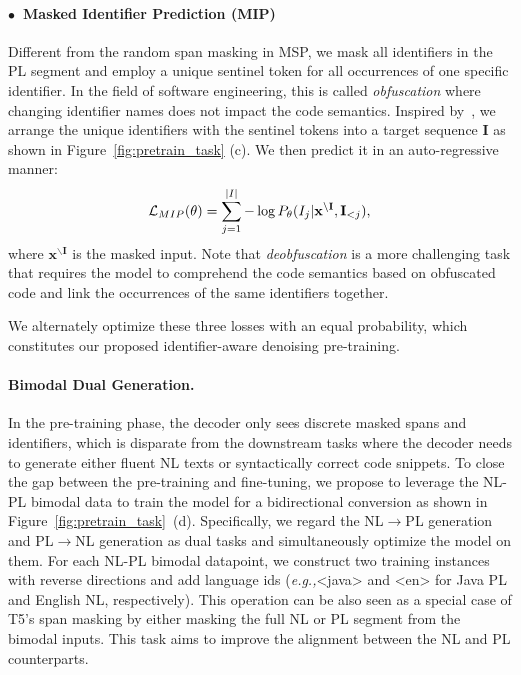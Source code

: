 \documentclass[11pt]{article}
\newcommand{\eg}{{\em e.g.,}\xspace}
\begin{document}
\paragraph{$\bullet$~Masked Identifier Prediction (MIP)} 
Different from the random span masking in MSP, we mask all identifiers in the PL segment and employ a unique sentinel token for all occurrences of one specific identifier. In the field of software engineering, this is called \emph{obfuscation} where changing identifier names does not impact the code semantics.  Inspired by~\citet{DBLP:journals/corr/abs-2102-07492}, we arrange the unique identifiers with the sentinel tokens into  a target sequence $\mathbf{I}$ as shown in Figure~\ref{fig:pretrain_task} (c).
We then predict it in an auto-regressive manner:
\begin{equation}\label{eq:IP}
\small 
\vspace{-0.5em}
  \mathcal{L}_{MIP} (\theta) = \sum_{j = 1}^{|I|} -\log P_{\theta}(I_j| \mathbf{x}^{\backslash \mathbf{I}}, \mathbf{I}_{<j}),
  \normalsize
  \vspace{-0.5em}
\end{equation}
\noindent where $\mathbf{x}^{\backslash \mathbf{I}}$ is the masked input. Note that \emph{deobfuscation} is a more challenging task that requires the model to comprehend the code semantics based on obfuscated code and link the occurrences of the same identifiers together.

We alternately optimize these three losses with an equal probability, which constitutes our proposed identifier-aware  denoising  pre-training.

\paragraph{Bimodal Dual Generation.}
In the  pre-training phase, the decoder only sees  discrete masked spans and identifiers, which is disparate from the downstream tasks where the decoder needs to generate either fluent NL texts or syntactically correct code snippets. To close the gap between the pre-training and fine-tuning, we propose to leverage the NL-PL bimodal data to train the model for a bidirectional conversion as shown in Figure~\ref{fig:pretrain_task}~(d).
Specifically, we regard the NL$\rightarrow$PL generation and   PL$\rightarrow$NL generation as  dual tasks and  simultaneously optimize the model on them.
For each NL-PL bimodal datapoint, we construct two training instances with reverse directions and add language ids (\eg <java> and <en> for Java PL and English NL, respectively). This operation can be also seen as a special case of T5's span masking by either masking the full NL or PL segment from the bimodal inputs. 
This task aims to improve the alignment between the NL and PL counterparts.
\end{document}
